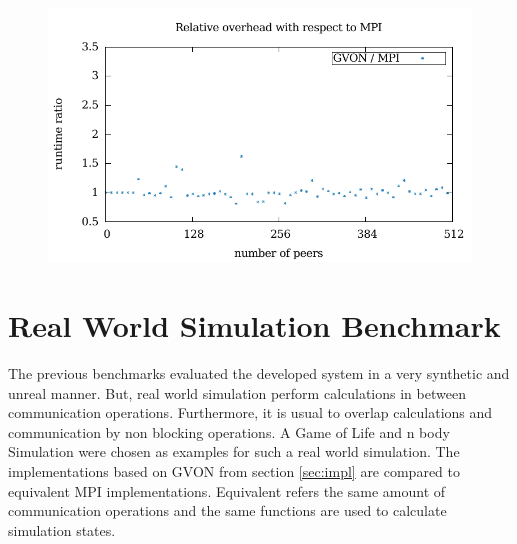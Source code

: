 \begin{figure}[H]
\begin{minipage}[t]{0.5\textwidth}
    \includegraphics[width=\textwidth]{plots/50_reduce_network_overhead_gvon_laser}
  \end{minipage}%
  \caption{ }
  \label{fig:reduce_laser}
\end{figure}


\section{Real World Simulation Benchmark}
The previous benchmarks evaluated the developed system in a very
synthetic and unreal manner. But, real world simulation perform
calculations in between communication operations. Furthermore, it is
usual to overlap calculations and communication by non blocking
operations. A Game of Life and n body Simulation were chosen as
examples for such a real world simulation. The implementations based
on GVON from section \ref{sec:impl} are compared to equivalent MPI
implementations.  Equivalent refers the same amount of communication
operations and the same functions are used to calculate simulation
states.


